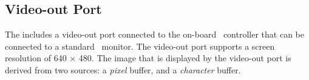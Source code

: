 \subsection{Video-out Port}
\label{sec:video_out}

The {\it \systemNameFull} includes a video-out port connected to the on-board
\videoOutDevice~controller that can be connected to a standard
\videoOutDevice~monitor. The video-out port supports a screen resolution
of 640 $\times$ 480. The image that is displayed by the video-out port is
derived from two sources: a {\it pixel} buffer, and a {\it character} buffer.









